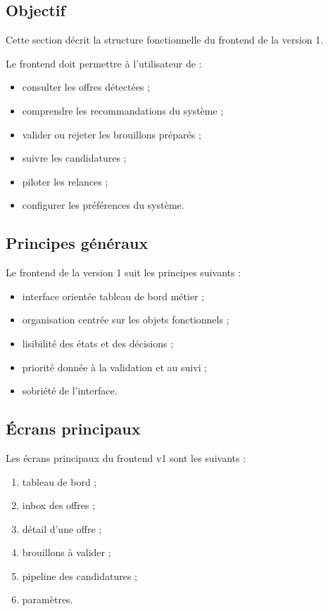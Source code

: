 \documentclass[11pt,a4paper]{article}
\begin{document}
\subsection{Objectif}

Cette section décrit la structure fonctionnelle du frontend de la version 1.

Le frontend doit permettre à l’utilisateur de :

\begin{itemize}
    \item consulter les offres détectées ;
    \item comprendre les recommandations du système ;
    \item valider ou rejeter les brouillons préparés ;
    \item suivre les candidatures ;
    \item piloter les relances ;
    \item configurer les préférences du système.
\end{itemize}

\subsection{Principes généraux}

Le frontend de la version 1 suit les principes suivants :

\begin{itemize}
    \item interface orientée tableau de bord métier ;
    \item organisation centrée sur les objets fonctionnels ;
    \item lisibilité des états et des décisions ;
    \item priorité donnée à la validation et au suivi ;
    \item sobriété de l’interface.
\end{itemize}

\subsection{Écrans principaux}

Les écrans principaux du frontend v1 sont les suivants :

\begin{enumerate}
    \item tableau de bord ;
    \item inbox des offres ;
    \item détail d’une offre ;
    \item brouillons à valider ;
    \item pipeline des candidatures ;
    \item paramètres.
\end{enumerate}
\end{document}
